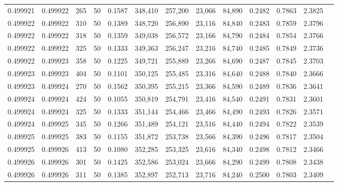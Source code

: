 \begin{tabular}{rrrrrrrrrrrrr}
0.499921 & 0.499922 &   265 &  50 &                                     0.1587 & 348,410 & 257,200 &  23,066 &  84,890 & 0.2482 & 0.7863 & 2.3825 \\
0.499922 & 0.499922 &   310 &  50 &                                     0.1389 & 348,720 & 256,890 &  23,116 &  84,840 & 0.2483 & 0.7859 & 2.3796 \\
0.499922 & 0.499922 &   318 &  50 &                                     0.1359 & 349,038 & 256,572 &  23,166 &  84,790 & 0.2484 & 0.7854 & 2.3766 \\
0.499922 & 0.499922 &   325 &  50 &                                     0.1333 & 349,363 & 256,247 &  23,216 &  84,740 & 0.2485 & 0.7849 & 2.3736 \\
0.499922 & 0.499923 &   358 &  50 &                                     0.1225 & 349,721 & 255,889 &  23,266 &  84,690 & 0.2487 & 0.7845 & 2.3703 \\
0.499923 & 0.499923 &   404 &  50 &                                     0.1101 & 350,125 & 255,485 &  23,316 &  84,640 & 0.2488 & 0.7840 & 2.3666 \\
0.499923 & 0.499924 &   270 &  50 &                                     0.1562 & 350,395 & 255,215 &  23,366 &  84,590 & 0.2489 & 0.7836 & 2.3641 \\
0.499924 & 0.499924 &   424 &  50 &                                     0.1055 & 350,819 & 254,791 &  23,416 &  84,540 & 0.2491 & 0.7831 & 2.3601 \\
0.499924 & 0.499924 &   325 &  50 &                                     0.1333 & 351,144 & 254,466 &  23,466 &  84,490 & 0.2493 & 0.7826 & 2.3571 \\
0.499924 & 0.499925 &   345 &  50 &                                     0.1266 & 351,489 & 254,121 &  23,516 &  84,440 & 0.2494 & 0.7822 & 2.3539 \\
0.499925 & 0.499925 &   383 &  50 &                                     0.1155 & 351,872 & 253,738 &  23,566 &  84,390 & 0.2496 & 0.7817 & 2.3504 \\
0.499925 & 0.499926 &   413 &  50 &                                     0.1080 & 352,285 & 253,325 &  23,616 &  84,340 & 0.2498 & 0.7812 & 2.3466 \\
0.499926 & 0.499926 &   301 &  50 &                                     0.1425 & 352,586 & 253,024 &  23,666 &  84,290 & 0.2499 & 0.7808 & 2.3438 \\
0.499926 & 0.499926 &   311 &  50 &                                     0.1385 & 352,897 & 252,713 &  23,716 &  84,240 & 0.2500 & 0.7803 & 2.3409 \\

\end{tabular}
